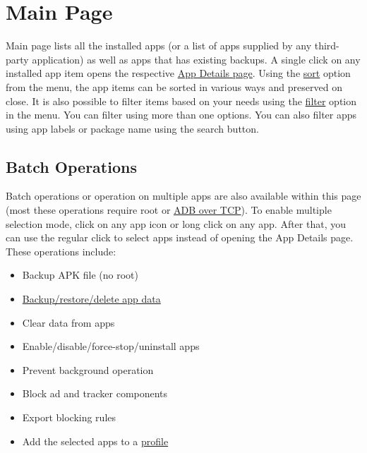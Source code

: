 \section{Main Page}\label{sec:main-page}
Main page lists all the installed apps (or a list of apps supplied by any third-party application) as well as apps that
has existing backups. A single click on any installed app item opens the respective \hyperref[sec:app-details-page]{App
Details page}. Using the \hyperlink{par:main-page-sort}{sort} option from the menu, the app items can be sorted in
various ways and preserved on close. It is also possible to filter items based on your needs using the
\hyperlink{par:main-page-filter}{filter} option in the menu. You can filter using more than one options. You can also
filter apps using app labels or package name using the search button.

\subsection{Batch Operations}\label{subsec:batch-operations}
Batch operations or operation on multiple apps are also available within this page (most these operations require root
or \hyperref[sec:adb-over-tcp]{ADB over TCP}). To enable multiple selection mode, click on any app icon or long click
on any app. After that, you can use the regular click to select apps instead of opening the App Details page. These
operations include:
\begin{itemize}
    \item Backup APK file (no root)
    \item \hyperref[sec:backup-restore]{Backup/restore/delete app data}
    \item Clear data from apps
    \item Enable/disable/force-stop/uninstall apps
    \item Prevent background operation
    \item Block ad and tracker components
    \item Export blocking rules
    \item Add the selected apps to a \hyperref[sec:profiles-page]{profile}
\end{itemize}

